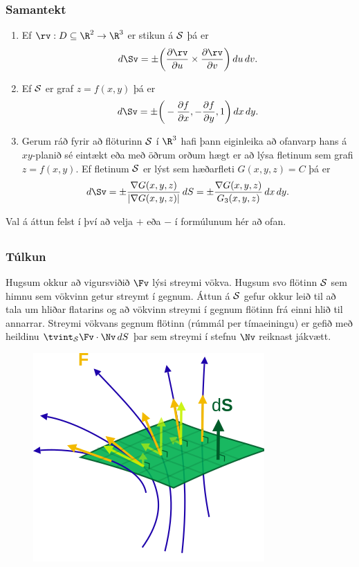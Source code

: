 \subsubsection{Samantekt \rtask{}}
  
\begin{enumerate}
\item Ef $\rv:D\subseteq\R^2\rightarrow \R^3$ er stikun á $\cal S$ þá
  er $$d\Sv=\pm \bigg(\frac{\partial \rv}{\partial u}\times\frac{\partial
  \rv}{\partial v}\bigg)\,du\,dv.$$
\item Ef $\cal S$ er graf $z=f(x,y)$ þá er 
$$d\Sv=\pm\bigg(-\frac{\partial f}{\partial x},-\frac{\partial
  f}{\partial y},1\bigg)\,dx\,dy.$$
\item Gerum ráð fyrir að flöturinn $\cal S$ í $\R^3$ hafi þann eiginleika að
  ofanvarp hans á $xy$-planið sé eintækt eða með öðrum orðum hægt er
  að lýsa fletinum sem grafi $z=f(x,y)$.
Ef fletinum $\cal S$ er lýst sem 
hæðarfleti $G(x,y,z)=C$ þá er  
$$d\Sv=\pm\frac{\nabla G(x,y,z)}{|\nabla G(x,y,z)|}\,dS=
\pm\frac{\nabla G(x,y,z)}{G_3(x,y,z)}\,dx\,dy.$$
\end{enumerate}
Val á áttun felst í því að velja $+$ eða $-$ í formúlunum hér að
ofan.  







\subsection{} 

\subsubsection{Túlkun \rtask{}}
 Hugsum okkur að vigursviðið $\Fv$ lýsi streymi
vökva.  Hugsum svo flötinn $\cal S$ sem himnu sem vökvinn getur
streymt í gegnum.  Áttun á $\cal S$ gefur okkur leið til að tala um
hliðar flatarins og að vökvinn streymi í gegnum flötinn frá
einni hlið til annarrar.  Streymi vökvans gegnum flötinn (rúmmál per
tímaeiningu) er gefið með heildinu $\tvint_{\cal S} \Fv\cdot\Nv\,dS$
  þar sem streymi í stefnu $\Nv$ reiknast jákvætt.

\begin {figure}[h!]
 \centering
            \includegraphics[width=0.45\linewidth]{flux.png}
            \caption*{}
\end {figure}



